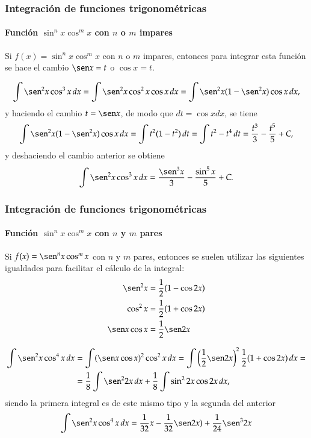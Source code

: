 \begin{frame}
	\frametitle{Integración de funciones trigonométricas}
	\framesubtitle{Función $\sin^n x\cos^m x$ con $n$ o $m$ impares}
	Si $f(x)=\sin^n x\cos^m x$ con $n$ o $m$ impares, entonces para integrar esta función se hace el cambio $\sen x = t$ o
	$\cos x =t$.
	
	\[
		\int \sen^2 x\cos^3 x\, dx = \int \sen^2 x\cos^2 x\cos x\, dx = \int \sen^2 x(1-\sen^2 x)\cos x\, dx,
	\]
	y haciendo el cambio $t=\sen x$, de modo que $dt = \cos x dx$, se tiene
	\[
		\int \sen^2 x(1-\sen^2 x)\cos x\, dx = \int t^2(1-t^2)\, dt = \int t^2-t^4 \, dt = \frac{t^3}{3}-\frac{t^5}{5}+C,
	\]
	y deshaciendo el cambio anterior se obtiene
	\[
		\int \sen^2 x\cos^3 x\, dx = \frac{\sen^3 x}{3}-\frac{\sin^5 x}{5}+C.
	\]
\end{frame}


\begin{frame}
	\frametitle{Integración de funciones trigonométricas}
	\framesubtitle{Función $\sin^n x\cos^m x$ con $n$ y $m$ pares}
	Si $f(x)=\sen^n x\cos^m x$ con $n$ y $m$ pares, entonces se suelen utilizar las siguientes igualdades para facilitar el
	cálculo de la integral:
	\begin{align*}
		\sen^2 x     & = \frac{1}{2}(1-\cos 2x) \\
		\cos^2 x     & = \frac{1}{2}(1+\cos 2x) \\
		\sen x\cos x & = \frac{1}{2}\sen 2x     
	\end{align*}
	
	\begin{align*}
		\int \sen^2 x\cos^4 x\, dx & = \int (\sen x\cos x)^2\cos^2 x\, dx = \int \left(\frac{1}{2}\sen      
		2x\right)^2\frac{1}{2}(1+\cos 2x)\,dx =\\
		                           & = \frac{1}{8}\int \sen^2 2x\,dx+\frac{1}{8}\int \sin^2 2x \cos 2x\,dx, 
	\end{align*}
	siendo la primera integral es de este mismo tipo y la segunda del anterior
	\[
		\int \sen^2 x\cos^4 x\, dx = \frac{1}{32}x-\frac{1}{32}\sen 2x)+\frac{1}{24}\sen^3 2x
	\] 
\end{frame}


